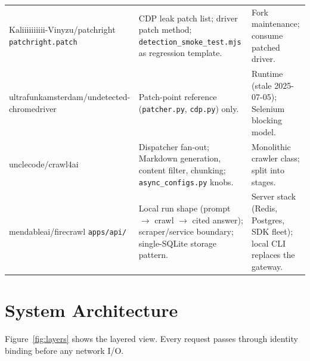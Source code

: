\documentclass[11pt,a4paper]{article}
\begin{document}
\begin{table}[H]
\begin{tabular}{@{}p{3.2cm}p{5.2cm}p{5.2cm}@{}}
Kaliiiiiiiiii-Vinyzu/patchright \newline \texttt{patchright.patch} &
CDP leak patch list; driver patch method; \texttt{detection\_smoke\_test.mjs} as regression template. &
Fork maintenance; consume patched driver. \\
ultrafunkamsterdam/undetected-chromedriver &
Patch-point reference (\texttt{patcher.py}, \texttt{cdp.py}) only. &
Runtime (stale 2025-07-05); Selenium blocking model. \\
unclecode/crawl4ai &
Dispatcher fan-out; Markdown generation, content filter, chunking; \texttt{async\_configs.py} knobs. &
Monolithic crawler class; split into stages. \\
mendableai/firecrawl \newline \texttt{apps/api/} &
Local run shape (prompt $\rightarrow$ crawl $\rightarrow$ cited answer); scraper/service boundary; single-SQLite storage pattern. &
Server stack (Redis, Postgres, SDK fleet); local CLI replaces the gateway. \\
\bottomrule
\end{tabular}
\end{table}

\section{System Architecture}
Figure~\ref{fig:layers} shows the layered view. Every request passes through identity binding before any network I/O.
\end{document}

